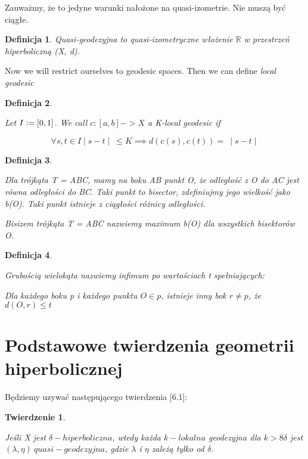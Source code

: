 \documentclass[licencjacka]{pracamgr}
\newcommand{\defeq}{\vcentcolon=}
\newtheorem{defi}{Definicja}[section]
\newtheorem{ther}{Twierdzenie}[section]
\begin{document}
Zauważmy, że to jedyne warunki nałożone na quasi-izometrie. Nie muszą być ciągłe.

\begin{defi}\label{Quasi-geodesic}
\emph{Quasi-geodezyjna} to quasi-izometryczne włożenie $\mathbb{R}$ w przestrzeń hiperboliczną (X, d).
\end{defi}

Now we will restrict ourselves to geodesic spaces. Then we can define \textit{local geodesic}

\begin{defi}\label{Local geodesic}

Let $I \defeq [0, 1]$.
We call $c : [a,b] -> X$ a K-local geodesic if

\[ \forall{s, t \in I} \mid s - t \mid \  \leq K \implies d(c(s), c(t)) = \ \mid s - t \mid \]

\end{defi}

\begin{defi}\label{Bisize of traingle}

Dla trójkąta T = ABC, mamy na boku AB punkt O, że odległość z O do AC jest równa odległości do BC. Taki punkt to bisector, zdefiniujmy jego wielkość jako b(O). Taki punkt istnieje z ciągłości różnicy odległości.

Bisizem trójkąta T = ABC nazwiemy maximum b(O) dla wszystkich bisektorów O.

\end{defi}

\begin{defi}\label{Thickness of polygon}

Grubością wielokąta nazwiemy infimum po wartościach t spełniających:

Dla każdego boku p i każdego punktu $O \in p$, istnieje inny bok $r \neq p$, że $d(O, r) \leq t$

\end{defi}

\section{Podstawowe twierdzenia geometrii hiperbolicznej}

Będziemy uzywać następującego twierdzenia \cite{bib:hyperbolicity_and_thw_word_problem}[6.1]:

\begin{ther}\label{thm:local_geodesic_is_quasi}

Jeśli X jest $\delta - hiperboliczna$, wtedy każda $k-lokalna$ geodezyjna dla $k > 8\delta$ jest $(\lambda, \eta)\  quasi-geodezyjna$, gdzie $\lambda$ i $\eta$ zależą tylko od $\delta$.

\end{ther}
\end{document}
